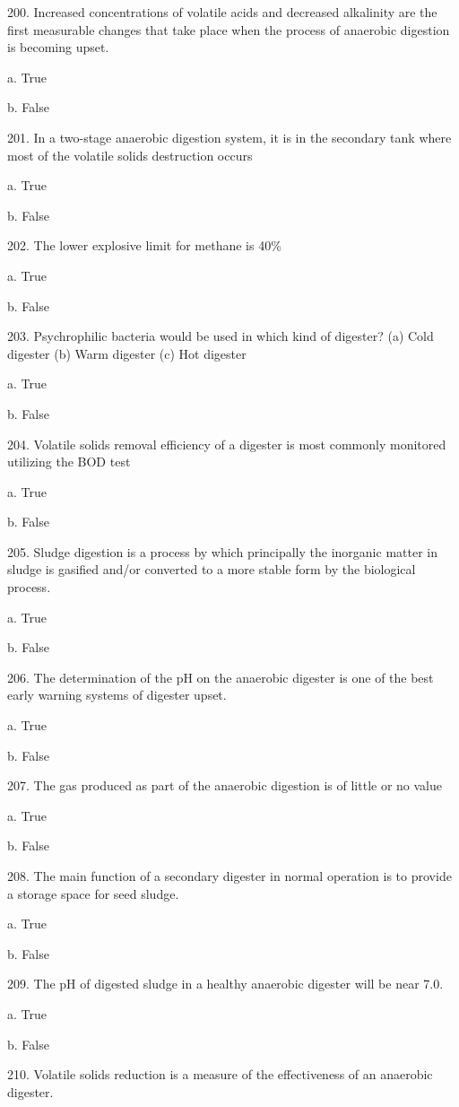 \documentclass{article}
\begin{document}
200. Increased concentrations of volatile acids and decreased alkalinity are the first measurable changes that take place when the process of anaerobic digestion is becoming upset. 

a. True 

b. False 


201. In a two-stage anaerobic digestion system, it is in the secondary tank where most of the volatile solids destruction occurs 

a. True 

b. False 


202. The lower explosive limit for methane is 40\% 

a. True 

b. False 


203. Psychrophilic bacteria would be used in which kind of digester?
(a) Cold digester
(b) Warm digester
(c) Hot digester 

a. True 

b. False 


204. Volatile solids removal efficiency of a digester is most commonly monitored utilizing the BOD test

a. True 

b. False 


205. Sludge digestion is a process by which principally the inorganic matter in sludge is gasified and/or converted to a more stable form by the biological process. 

a. True 

b. False 


206. The determination of the pH on the anaerobic digester is one of the best early warning systems of digester upset. 

a. True 

b. False 


207. The gas produced as part of the anaerobic digestion is of little or no value 

a. True 

b. False 


208. The main function of a secondary digester in normal operation is to provide a storage space for seed sludge. 

a. True 

b. False 


209. The pH of digested sludge in a healthy anaerobic digester will be near 7.0. 

a. True 

b. False 


210. Volatile solids reduction is a measure of the effectiveness of an anaerobic digester. 
\end{document}
